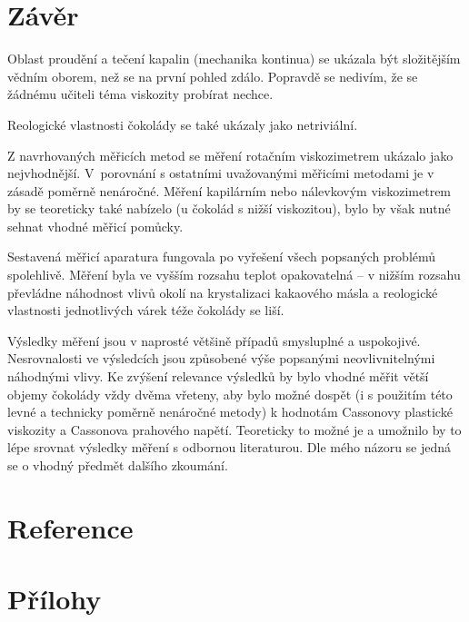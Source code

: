 \documentclass[12pt]{article}
\begin{document}
\section{Závěr}
Oblast proudění a tečení kapalin (mechanika kontinua) se ukázala být složitějším vědním oborem, než se na první pohled zdálo. Popravdě se nedivím, že se žádnému učiteli téma viskozity probírat nechce.
\par\noindent
Reologické vlastnosti čokolády se také ukázaly jako netriviální.
\par\noindent
Z navrhovaných měřicích metod se měření rotačním viskozimetrem ukázalo jako nejvhodnější. V~porovnání s ostatními uvažovanými měřicími metodami je v zásadě poměrně nenáročné. Měření kapilárním nebo nálevkovým viskozimetrem by se teoreticky také nabízelo (u čokolád s nižší viskozitou), bylo by však nutné sehnat vhodné měřicí pomůcky.
\par\noindent
Sestavená měřicí aparatura fungovala po vyřešení všech popsaných problémů spolehlivě. Měření byla ve vyšším rozsahu teplot opakovatelná -- v nižším rozsahu převládne náhodnost vlivů okolí na krystalizaci kakaového másla a reologické vlastnosti jednotlivých várek téže čokolády se liší.
\par\noindent
Výsledky měření jsou v naprosté většině případů smysluplné a uspokojivé. Nesrovnalosti ve výsledcích jsou způsobené výše popsanými neovlivnitelnými náhodnými vlivy. Ke zvýšení relevance výsledků by bylo vhodné měřit větší objemy čokolády vždy dvěma vřeteny, aby bylo možné dospět (i s použitím této levné a technicky poměrně nenáročné metody) k hodnotám Cassonovy plastické viskozity a Cassonova prahového napětí. Teoreticky to možné je a umožnilo by to lépe srovnat výsledky měření s odbornou literaturou. Dle mého názoru se jedná se o vhodný předmět dalšího zkoumání.

\newpage
\section*{Reference} 
\printbibliography[heading=none]

\newpage
\pagestyle{empty}
\section*{Přílohy} 
\end{document}
